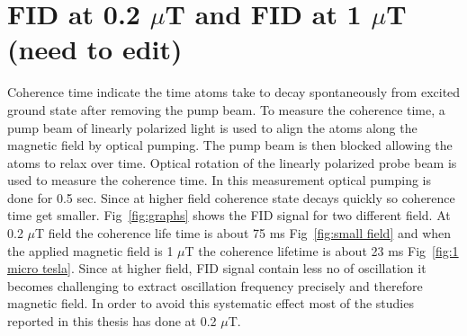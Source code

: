    \section{FID at 0.2 $\mu$T and FID at 
  1 $\mu$T (need to edit) }
  Coherence time indicate the time atoms take to decay spontaneously from excited ground state after removing the pump beam. To measure the coherence time, a pump beam of linearly polarized light is
used to align the atoms along the magnetic field by optical pumping. The pump
beam is then blocked allowing the atoms to relax over time. Optical rotation of the linearly polarized probe beam is used to measure the coherence time. In this measurement optical pumping is done for 0.5 sec. Since at higher field coherence state decays quickly so coherence time get smaller. Fig~\ref{fig:graphs} shows the FID signal for  two different field.  At  0.2 $\mu$T field the coherence life time is about 75 ms Fig~\ref{fig:small field} and when the applied magnetic field is 1 $\mu$T  the coherence lifetime is about 23 ms Fig~\ref{fig:1 micro tesla}. Since at higher field, FID signal contain less no of oscillation it becomes challenging to extract oscillation frequency precisely and therefore magnetic field. In order to avoid this systematic effect most of the studies reported in this thesis has done at 0.2 $\mu$T.
